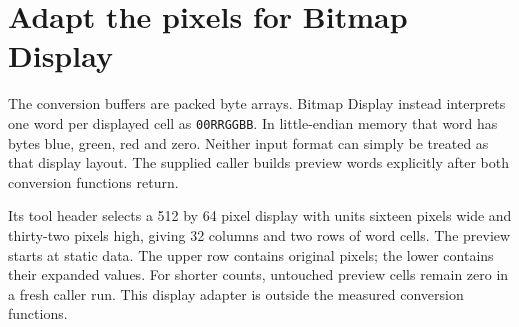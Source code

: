 \section{Adapt the pixels for Bitmap Display}\label{rgb-view}
The conversion buffers are packed byte arrays. Bitmap Display instead interprets
one word per displayed cell as \texttt{00RRGGBB}. In little-endian memory that word
has bytes blue, green, red and zero. Neither input format can simply be treated as
that display layout. The supplied caller builds preview words explicitly after
both conversion functions return.

Its tool header selects a 512 by 64 pixel display with units sixteen pixels wide and
thirty-two pixels high, giving 32 columns and two rows of word cells. The preview starts at static data. The upper
row contains original pixels; the lower contains their expanded values. For shorter
counts, untouched preview cells remain zero in a fresh caller run. This display
adapter is outside the measured conversion functions.


